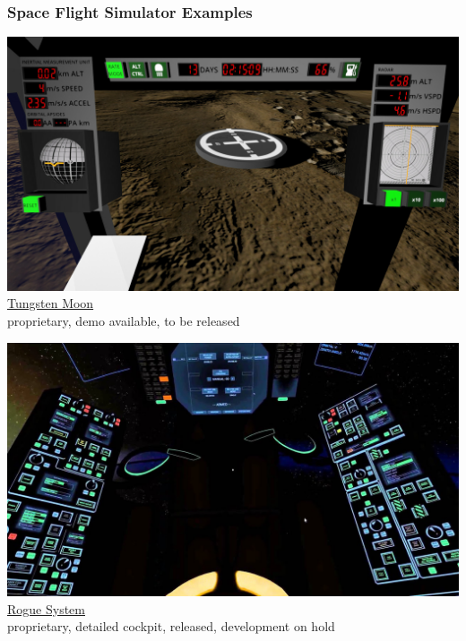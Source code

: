 \documentclass[aspectratio=169,11pt,xcolor=dvipsnames]{beamer}
\begin{document}
\begin{frame}
  \frametitle{Space Flight Simulator Examples}
  \begin{minipage}[t]{0.49\textwidth}
    \begin{center}
      \includegraphics[width=\textwidth]{tungsten-moon}\\
      \href{https://tungstenmoon.com/}{Tungsten Moon}\\
      proprietary, demo available, to be released
    \end{center}
  \end{minipage}
  \begin{minipage}[t]{0.49\textwidth}
    \begin{center}
      \includegraphics[width=\textwidth]{rogue-system}\\
      \href{https://imagespaceinc.com/rogsys/}{Rogue System}\\
      proprietary, detailed cockpit, released, development on hold
    \end{center}
  \end{minipage}
\end{frame}
\end{document}
